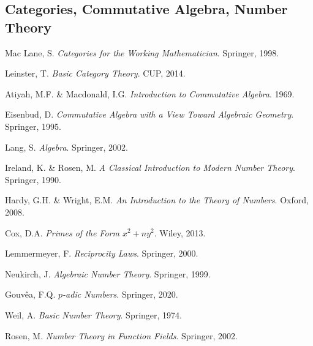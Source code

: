 \documentclass[11pt,a4paper]{article}
\begin{document}
	\subsection*{Categories, Commutative Algebra, Number Theory}
	\begin{enumerate}[label={[\arabic*]},resume]
		\item Mac Lane, S. \emph{Categories for the Working Mathematician}. Springer, 1998.
		\item Leinster, T. \emph{Basic Category Theory}. CUP, 2014.
		\item Atiyah, M.F. \& Macdonald, I.G. \emph{Introduction to Commutative Algebra}. 1969.
		\item Eisenbud, D. \emph{Commutative Algebra with a View Toward Algebraic Geometry}. Springer, 1995.
		\item Lang, S. \emph{Algebra}. Springer, 2002.
		\item Ireland, K. \& Rosen, M. \emph{A Classical Introduction to Modern Number Theory}. Springer, 1990.
		\item Hardy, G.H. \& Wright, E.M. \emph{An Introduction to the Theory of Numbers}. Oxford, 2008.
		\item Cox, D.A. \emph{Primes of the Form $x^2+ny^2$}. Wiley, 2013.
		\item Lemmermeyer, F. \emph{Reciprocity Laws}. Springer, 2000.
		\item Neukirch, J. \emph{Algebraic Number Theory}. Springer, 1999.
		\item Gouv\^ea, F.Q. \emph{$p$-adic Numbers}. Springer, 2020.
		\item Weil, A. \emph{Basic Number Theory}. Springer, 1974.
		\item Rosen, M. \emph{Number Theory in Function Fields}. Springer, 2002.
	\end{enumerate}
\end{document}

